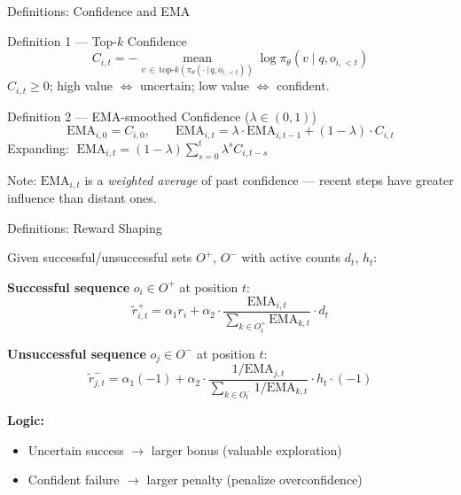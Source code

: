 \documentclass[aspectratio=169, 11pt]{beamer}
\newcommand{\EMA}{\mathrm{EMA}}
\newcommand{\Oplus}{O^+}
\newcommand{\Ominus}{O^-}
\begin{document}
\begin{frame}{Definitions: Confidence and EMA}

\begin{block}{Definition 1 — Top-$k$ Confidence}
\[
C_{i,t} = -\operatorname*{mean}_{v \,\in\, \mathrm{top\text{-}}k(\pi_\theta(\cdot\,|\,q, o_{i,<t}))} \log \pi_\theta(v \mid q, o_{i,<t})
\]
$C_{i,t} \geq 0$;\; high value $\Leftrightarrow$ uncertain;\; low value $\Leftrightarrow$ confident.
\end{block}

\medskip

\begin{block}{Definition 2 — EMA-smoothed Confidence ($\lambda \in (0,1)$)}
\[
\EMA_{i,0} = C_{i,0}, \qquad
\EMA_{i,t} = \lambda \cdot \EMA_{i,t-1} + (1-\lambda) \cdot C_{i,t}
\]
Expanding: $\;\EMA_{i,t} = (1-\lambda)\sum_{s=0}^{t} \lambda^s C_{i,t-s}$
\end{block}

\medskip
Note: $\EMA_{i,t}$ is a \emph{weighted average} of past confidence — recent steps
have greater influence than distant ones.

\end{frame}

\begin{frame}{Definitions: Reward Shaping}

Given successful/unsuccessful sets $\Oplus$, $\Ominus$ with active counts $d_t$, $h_t$:

\medskip

\textbf{Successful sequence} $o_i \in \Oplus$ at position $t$:
\[
\tilde{r}^+_{i,t} = \alpha_1 r_i + \alpha_2 \cdot \frac{\EMA_{i,t}}{\displaystyle\sum_{k \in O^+_t} \EMA_{k,t}} \cdot d_t
\]

\textbf{Unsuccessful sequence} $o_j \in \Ominus$ at position $t$:
\[
\tilde{r}^-_{j,t} = \alpha_1 (-1) + \alpha_2 \cdot \frac{1/\EMA_{j,t}}{\displaystyle\sum_{k \in O^-_t} 1/\EMA_{k,t}} \cdot h_t \cdot (-1)
\]

\medskip
\textbf{Logic:}
\begin{itemize}
  \item Uncertain success $\to$ larger bonus (valuable exploration)
  \item Confident failure $\to$ larger penalty (penalize overconfidence)
\end{itemize}

\end{frame}
\end{document}
